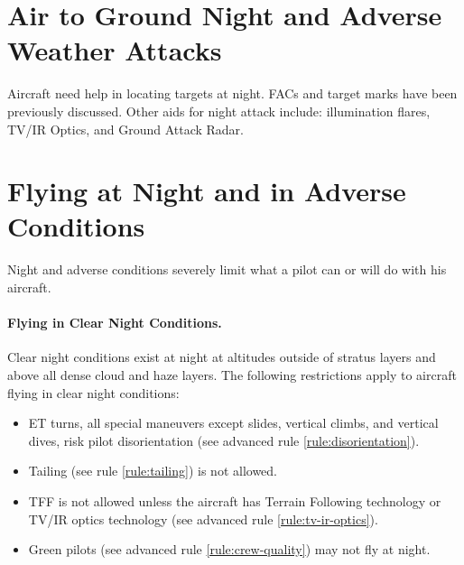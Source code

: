 \begin{advancedrules}
{\begin{itemize}
\end{itemize}

\section{Air to Ground Night and Adverse Weather Attacks}

Aircraft need help in locating targets at night. FACs and target marks have been previously discussed. Other aids for night attack include: illumination flares, TV/IR Optics, and Ground Attack Radar.

}{

\section{Flying at Night and in Adverse Conditions}
\label{rule:flying-at-night}
\label{rule:adverse-conditions}

Night and adverse conditions severely limit what a pilot can or will do with his aircraft.

\paragraph{Flying in Clear Night Conditions.}

Clear night conditions exist at night at altitudes outside of stratus layers and above all dense cloud and haze layers. The following restrictions apply to aircraft flying in clear night conditions:

\begin{itemize}

    \item{} ET turns, all special maneuvers except slides, vertical climbs, and vertical dives, risk pilot disorientation (see advanced rule \ref{rule:disorientation}).

    \item{} Tailing (see rule \ref{rule:tailing}) is not allowed.
    
    \item{} TFF is not allowed unless the aircraft has Terrain Following technology or TV/IR optics technology (see advanced rule \ref{rule:tv-ir-optics}).

    \item{} Green pilots (see advanced rule \ref{rule:crew-quality}) may not fly at night.

\end{itemize}

}
\end{advancedrules}
